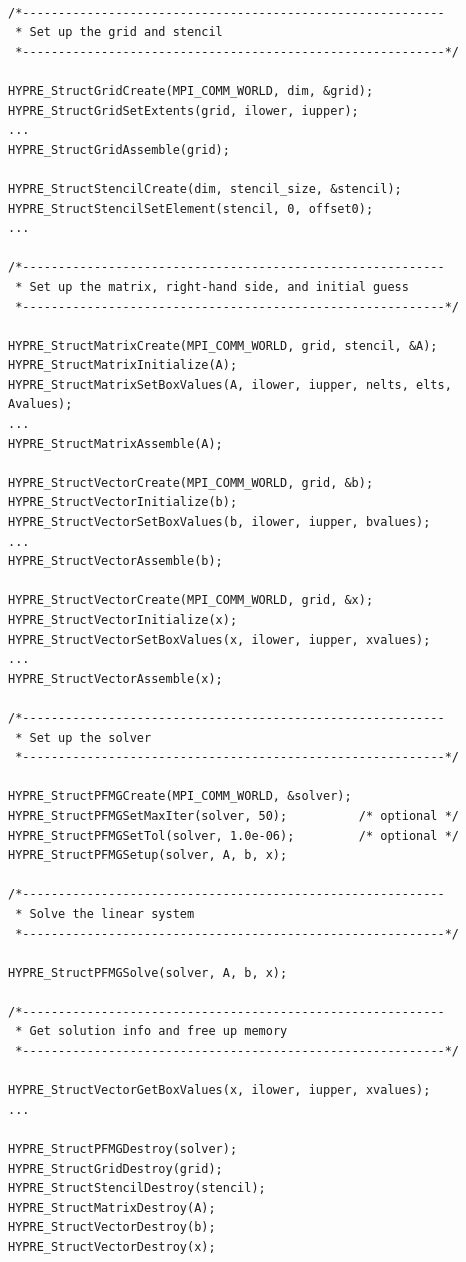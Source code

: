 \begin{display}
\begin{verbatim}

/*-----------------------------------------------------------
 * Set up the grid and stencil
 *-----------------------------------------------------------*/

HYPRE_StructGridCreate(MPI_COMM_WORLD, dim, &grid);
HYPRE_StructGridSetExtents(grid, ilower, iupper);
...
HYPRE_StructGridAssemble(grid);
	
HYPRE_StructStencilCreate(dim, stencil_size, &stencil);
HYPRE_StructStencilSetElement(stencil, 0, offset0);
...

/*-----------------------------------------------------------
 * Set up the matrix, right-hand side, and initial guess
 *-----------------------------------------------------------*/

HYPRE_StructMatrixCreate(MPI_COMM_WORLD, grid, stencil, &A);
HYPRE_StructMatrixInitialize(A);
HYPRE_StructMatrixSetBoxValues(A, ilower, iupper, nelts, elts, Avalues);
...
HYPRE_StructMatrixAssemble(A);

HYPRE_StructVectorCreate(MPI_COMM_WORLD, grid, &b);
HYPRE_StructVectorInitialize(b);
HYPRE_StructVectorSetBoxValues(b, ilower, iupper, bvalues);
...
HYPRE_StructVectorAssemble(b);

HYPRE_StructVectorCreate(MPI_COMM_WORLD, grid, &x);
HYPRE_StructVectorInitialize(x);
HYPRE_StructVectorSetBoxValues(x, ilower, iupper, xvalues);
...
HYPRE_StructVectorAssemble(x);

/*-----------------------------------------------------------
 * Set up the solver
 *-----------------------------------------------------------*/

HYPRE_StructPFMGCreate(MPI_COMM_WORLD, &solver);
HYPRE_StructPFMGSetMaxIter(solver, 50);     	 /* optional */
HYPRE_StructPFMGSetTol(solver, 1.0e-06);    	 /* optional */
HYPRE_StructPFMGSetup(solver, A, b, x);

/*-----------------------------------------------------------
 * Solve the linear system
 *-----------------------------------------------------------*/

HYPRE_StructPFMGSolve(solver, A, b, x);

/*-----------------------------------------------------------
 * Get solution info and free up memory
 *-----------------------------------------------------------*/

HYPRE_StructVectorGetBoxValues(x, ilower, iupper, xvalues);
...

HYPRE_StructPFMGDestroy(solver);
HYPRE_StructGridDestroy(grid);
HYPRE_StructStencilDestroy(stencil);
HYPRE_StructMatrixDestroy(A);
HYPRE_StructVectorDestroy(b);
HYPRE_StructVectorDestroy(x);

\end{verbatim}
\end{display}

